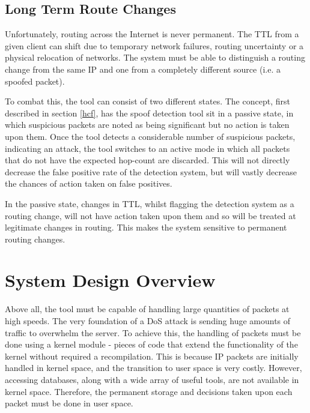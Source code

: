 \documentclass[12pt,twoside]{article}
\begin{document}
\subsection{Long Term Route Changes} \label{modes}
Unfortunately, routing across the Internet is never permanent. The TTL from a given client can shift due to temporary network failures, routing uncertainty or a physical relocation of networks. The system must be able to distinguish a routing change from the same IP and one from a completely different source (i.e. a spoofed packet). 

To combat this, the tool can consist of two different states. The concept, first described in section \ref{hcf}, has the spoof detection tool sit in a passive state, in which suspicious packets are noted as being significant but no action is taken upon them. Once the tool detects a considerable number of suspicious packets, indicating an attack, the tool switches to an active mode in which all packets that do not have the expected hop-count are discarded. This will not directly decrease the false positive rate of the detection system, but will vastly decrease the chances of action taken on false positives.

In the passive state, changes in TTL, whilst flagging the detection system as a routing change, will not have action taken upon them and so will be treated at legitimate changes in routing. This makes the system sensitive to permanent routing changes.


\section{System Design Overview}
Above all, the tool must be capable of handling large quantities of packets at high speeds. The very foundation of a DoS attack is sending huge amounts of traffic to overwhelm the server. To achieve this, the handling of packets must be done using a kernel module - pieces of code that extend the functionality of the kernel without required a recompilation. This is because IP packets are initially handled in kernel space, and the transition to user space is very costly. However, accessing databases, along with a wide array of useful tools, are not available in kernel space. Therefore, the permanent storage and decisions taken upon each packet must be done in user space. 
\end{document}
